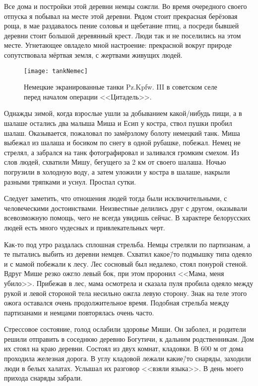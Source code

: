 Все дома и постройки этой деревни немцы сожгли. Во время очередного своего отпуска я побывал на месте этой деревни. Рядом стоит прекрасная берёзовая роща, в мае раздавалось пение соловья и щебетание птиц, а посреди бывшей деревни стоит большой деревянный крест. Люди так и не поселились на этом месте. Угнетающее овладело мной настроение: прекрасной вокруг природе сопутствовала мёртвая земля, с жертвами живущих людей. 

\begin{wrapfigure}{O}{.4\textwidth}
\centering
\texttt{[image: tankNemec]}
\caption{Немецкие экранированные танки Pz.Kpfw. III в советском селе перед началом операции <<Цитадель>>.}
\label{fig:tankNemec}
\end{wrapfigure}

Однажды зимой, когда взрослые ушли за добыванием какой\-/нибудь пищи, а в шалаше остались два малыша Миша и Есип у костра, ствол пушки пробил шалаш. Оказывается, пожаловал по замёрзлому болоту немецкий танк. Миша выбежал из шалаша и босиком по снегу в одной рубашке, побежал. Немец не стрелял, а забрался на танк фотографировал и заливался громким смехом. Из слов людей, схватили Мишу, бегущего за 2 км от своего шалаша. Ночью погрузили в холодную воду, а затем уложили у костра в шалаше, накрыли разными тряпками и уснул. Проспал сутки. 

Следует заметить, что отношения людей тогда были исключительными, с человеческими достоинствами. Неизвестные делились друг с другом, оказывали всевозможную помощь, чего не всегда увидишь сейчас. В характере белорусских людей есть много чудесных и привлекательных черт. 

Как-то под утро раздалась сплошная стрельба. Немцы стреляли по партизанам, а те пытались выбить из деревни немцев. Схватил какое\=/то подмышку типа одеяло и с мамой побежали к лесу. Лес сосновый был недалеко, стоял понурой стеной. Вдруг Мише резко ожгло левый бок, при этом проронил <<Мама, меня убило>>. Прибежав в лес, мама осмотрела и сказала пуля пробила одеяло между рукой и левой стороной тела несильно ожгла левую сторону. Знак на теле этого ожога оставался очень продолжительное время. Подобная стрельба между партизанами и немцами повторялась очень часто.

Стрессовое состояние, голод ослабили здоровье Миши. Он заболел, и родители решили отправить в соседнюю деревню Богутичи, к дальним родственникам. Дом их стоял на краю деревни. Состоял из двух комнат, кладовки. В 600 м от дома проходила железная дорога. В углу кладовой лежали какие\=/то снаряды, заходили люди в белых халатах. Услышал их разговор <<взяли языка>>. В день моего прихода снаряды забрали. 

